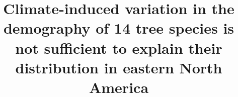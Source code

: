 \documentclass[letterpaper, 12pt]{article}
\title{Climate-induced variation in the demography of 14 tree species is not sufficient to explain their distribution in eastern North America}
\author{}
\theoremstyle{theo}
\begin{document}
\maketitle

\begin{onehalfspace}








\end{onehalfspace}

\begin{refcontext}[sorting=nyt]
\printbibliography
\end{refcontext}


\end{document}
